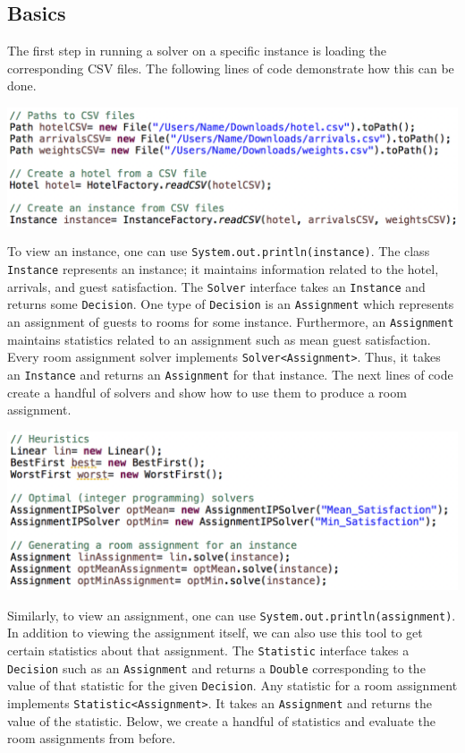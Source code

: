 \documentclass[11 pt]{article}
\begin{document}
\subsection{Basics}
\par The first step in running a solver on a specific instance is loading the corresponding CSV files. The following lines of code demonstrate how this can be done.
\begin{center}
\includegraphics[scale=0.7]{images/readCSVCode.png}
\end{center}
\par To view an instance, one can use \texttt{System.out.println(instance)}. The class \texttt{Instance} represents an instance; it maintains information related to the hotel, arrivals, and guest satisfaction. The \texttt{Solver} interface takes an \texttt{Instance} and returns some \texttt{Decision}. One type of \texttt{Decision} is an \texttt{Assignment} which represents an assignment of guests to rooms for some instance. Furthermore, an \texttt{Assignment} maintains statistics related to an assignment such as mean guest satisfaction. Every room assignment solver implements \texttt{Solver<Assignment>}. Thus, it takes an \texttt{Instance} and returns an \texttt{Assignment} for that instance. The next lines of code create a handful of solvers and show how to use them to produce a room assignment.
\begin{center}
\includegraphics[scale=0.7]{images/runSolversCode.png}
\end{center}
\par Similarly, to view an assignment, one can use \texttt{System.out.println(assignment)}. In addition to viewing the assignment itself, we can also use this tool to get certain statistics about that assignment. The \texttt{Statistic} interface takes a \texttt{Decision} such as an \texttt{Assignment} and returns a \texttt{Double} corresponding to the value of that statistic for the given \texttt{Decision}. Any statistic for a room assignment implements \texttt{Statistic<Assignment>}. It takes an \texttt{Assignment} and returns the value of the statistic. Below, we create a handful of statistics and evaluate the room assignments from before.
\end{document}
